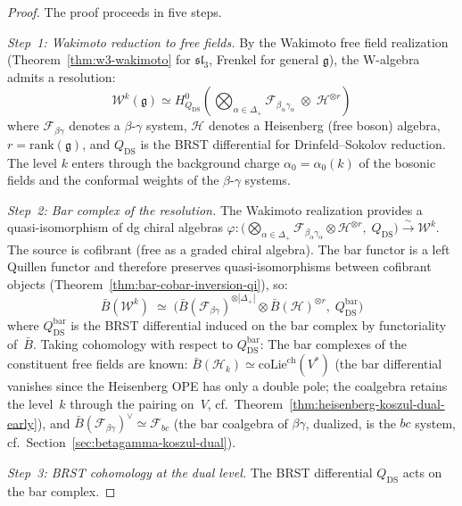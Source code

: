 \begin{proof}
The proof proceeds in five steps.

\emph{Step~1: Wakimoto reduction to free fields.}
By the Wakimoto free field realization (Theorem~\ref{thm:w3-wakimoto} for $\mathfrak{sl}_3$, Frenkel \cite{Feigin-Frenkel} for general $\mathfrak{g}$), the W-algebra admits a resolution:
\[
\mathcal{W}^k(\mathfrak{g}) \simeq H^0_{Q_{\mathrm{DS}}}\!\left(\bigotimes_{\alpha \in \Delta_+} \mathcal{F}_{\beta_\alpha\gamma_\alpha} \;\otimes\; \mathcal{H}^{\otimes r}\right)
\]
where $\mathcal{F}_{\beta\gamma}$ denotes a $\beta$-$\gamma$ system, $\mathcal{H}$ denotes a Heisenberg (free boson) algebra, $r = \mathrm{rank}(\mathfrak{g})$, and $Q_{\mathrm{DS}}$ is the BRST differential for Drinfeld--Sokolov reduction.  The level $k$ enters through the background charge $\alpha_0 = \alpha_0(k)$ of the bosonic fields and the conformal weights of the $\beta$-$\gamma$ systems.

\emph{Step~2: Bar complex of the resolution.}
The Wakimoto realization provides a quasi-isomorphism of dg chiral
algebras
$\varphi\colon \bigl(\bigotimes_{\alpha \in \Delta_+}
\mathcal{F}_{\beta_\alpha\gamma_\alpha}
\otimes \mathcal{H}^{\otimes r},\; Q_{\mathrm{DS}}\bigr)
\xrightarrow{\;\sim\;} \mathcal{W}^k$.
The source is cofibrant (free as a graded chiral algebra).
The bar functor is a left Quillen functor and therefore preserves
quasi-isomorphisms between cofibrant objects
(Theorem~\ref{thm:bar-cobar-inversion-qi}), so:
\[
\bar{B}(\mathcal{W}^k) \;\simeq\;
\bigl(\bar{B}(\mathcal{F}_{\beta\gamma})^{\otimes |\Delta_+|}
\otimes \bar{B}(\mathcal{H})^{\otimes r},\;
Q_{\mathrm{DS}}^{\mathrm{bar}}\bigr)
\]
where $Q_{\mathrm{DS}}^{\mathrm{bar}}$ is the BRST differential
induced on the bar complex by functoriality of~$\bar{B}$.
Taking cohomology with respect to
$Q_{\mathrm{DS}}^{\mathrm{bar}}$:
The bar complexes of the constituent free fields are known: $\bar{B}(\mathcal{H}_k) \simeq \mathrm{coLie}^{\mathrm{ch}}(V^*)$ (the bar differential vanishes since the Heisenberg OPE has only a double pole; the coalgebra retains the level~$k$ through the pairing on~$V$, cf.\ Theorem~\ref{thm:heisenberg-koszul-dual-early}), and $\bar{B}(\mathcal{F}_{\beta\gamma})^\vee \simeq \mathcal{F}_{bc}$ (the bar coalgebra of $\beta\gamma$, dualized, is the $bc$ system, cf.\ Section~\ref{sec:betagamma-koszul-dual}).

\emph{Step~3: BRST cohomology at the dual level.}
The BRST differential $Q_{\mathrm{DS}}$ acts on the bar complex.


\end{proof}
